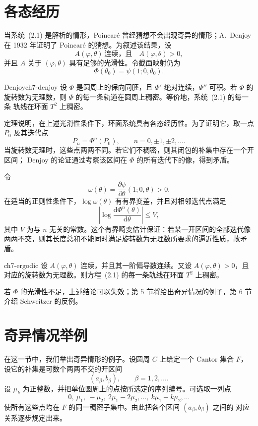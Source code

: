 \section{各态经历}

当系统~(2.1) 是解析的情形，Poincar\'e 曾经猜想不会出现奇异的情形；A.~Denjoy 在
1932 年证明了 Poincar\'e 的猜想。为叙述该结果，设
\[
  A(\varphi,\theta)\ \text{连续，且}\quad A(\varphi,\theta)>0,
\]
并且 $A$ 关于 $(\varphi,\theta)$ 具有足够的光滑性。令截面映射仍为
\[
  \Phi(\theta_0)=\psi(1;0,\theta_0).
\]

\begin{theorem}{Denjoy}{ch7-denjoy}
设 $\Phi$ 是圆周上的保向同胚，且 $\Phi'$ 绝对连续，$\Phi''$ 可积。若 $\Phi$ 的
旋转数为无理数，则 $\Phi$ 的每一条轨道在圆周上稠密。等价地，系统~(2.1) 的每一条
轨线在环面 $T^2$ 上稠密。
\end{theorem}

定理说明，在上述光滑性条件下，环面系统具有各态经历性。为了证明它，取一点
$P_0$ 及其迭代点
\[
  P_n=\Phi^n(P_0),\qquad n=0,\pm1,\pm2,\ldots . \tag{4.1}
\]
当旋转数无理时，这些点两两不同。若它们不稠密，则其闭包的补集中存在一个开区间；
Denjoy 的论证通过考察该区间在 $\Phi$ 的所有迭代下的像，得到矛盾。

令
\[
  \omega(\theta)=\dfrac{\partial\psi}{\partial\theta}(1;0,\theta)>0.
\]
在适当的正则性条件下，$\log\omega(\theta)$ 有有界变差，并且对相邻迭代点满足
\[
  \left|\log\dfrac{\mathrm d\Phi^n(\theta)}{\mathrm d\theta}\right|\leq V, \tag{4.2}
\]
其中 $V$ 为与 $n$ 无关的常数。这个有界畸变估计保证：若某一开区间的全部迭代像
两两不交，则其长度总和不能同时满足旋转数为无理数所要求的逼近性质，故矛盾。

\begin{theorem}{}{ch7-ergodic}
设 $A(\varphi,\theta)$ 连续，并且其一阶偏导数连续。又设 $A(\varphi,\theta)>0$，且
对应的旋转数为无理数。则方程~(2.1) 的每一条轨线在环面 $T^2$ 上稠密。
\end{theorem}

若 $\Phi$ 的光滑性不足，上述结论可以失效；第 5 节将给出奇异情况的例子，第 6 节
介绍 Schweitzer 的反例。

\section{奇异情况举例}

在这一节中，我们举出奇异情形的例子。设圆周 $C$ 上给定一个 Cantor 集合 $F$，
设它的补集是可数个两两不交的开区间
\[
  (a_\beta,b_\beta),\qquad \beta=1,2,\ldots .
\]
设 $\mu_k$ 为正整数，并把单位圆周上的点按所选定的序列编号。可选取一列点
\[
  0,\ \mu_1,\ -\mu_2,\ 2\mu_1-2\mu_2,\ldots,\ k\mu_1-k\mu_2,\ldots \tag{5.1}
\]
使所有这些点均在 $F$ 的同一稠密子集中。由此把各个区间 $(a_\beta,b_\beta)$ 之间的
对应关系逐步规定出来。

